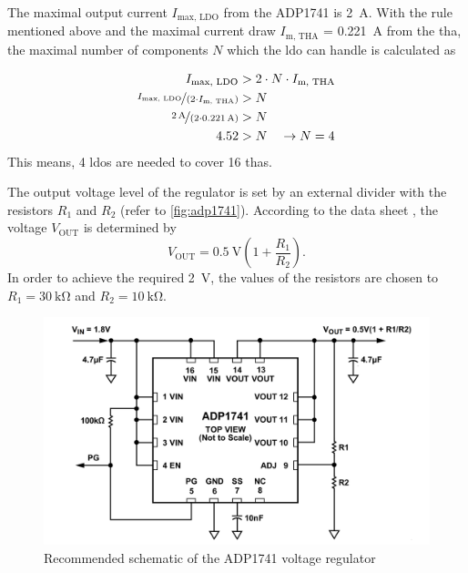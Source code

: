 The maximal output current $I_\text{max, LDO}$ from the ADP1741 is \SI{2}{\ampere}.
With the rule mentioned above and the maximal current draw $I_\text{m, THA}$ = \SI{0.221}{\ampere} from the \gls{tha}, the maximal number of components $N$ which the \gls{ldo} can handle is calculated as 

\begin{align*}
	I_\text{max, LDO}                              & > 2 \cdot N \cdot I_\text{m, THA} \\
	\nicefrac{I_\text{max, LDO}}{(2 \cdot I_\text{m, THA}) }   & > N                               \\
	\nicefrac{\SI{2}{\ampere}}{(2 \cdot \SI{0.221}{\ampere})}& > N                               \\
	4.52                                           & > N \quad \rightarrow N = 4
\end{align*}
This means, 4 \glspl{ldo} are needed to cover 16 \glspl{tha}.

The output voltage level of the regulator is set by an external divider with the resistors $R_1$ and $R_2$ (refer to \autoref{fig:adp1741}). According to the data sheet \cite{adp1741}, the voltage $V_\text{OUT}$ is determined by
\begin{equation}\label{eq:ldo}
	V_\text{OUT} = \SI{0.5}{\volt}\left(1 + \frac{R_1}{R_2} \right).
\end{equation}
In order to achieve the required \SI{2}{\volt}, the values of the resistors are chosen to $R_1 = \SI{30}{\kilo\ohm}$ and $R_2 = \SI{10}{\kilo \ohm}$. 

\begin{figure}[tb]
	\centering
	\includegraphics[width = \textwidth]{chap/04-theresa/img/schematic/adp1741_d}
	\caption{Recommended schematic of the ADP1741 voltage regulator \cite{adp1741}}
	\label{fig:adp1741}
\end{figure}

